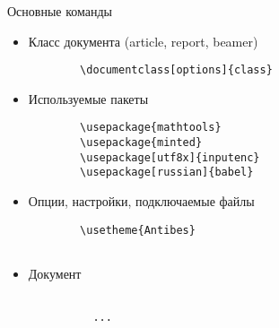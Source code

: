 \begin{frame}[fragile]{Основные команды}
  \begin{itemize}
    \item Класс документа (article, report, beamer)
      \begin{verbatim}
        \documentclass[options]{class}
      \end{verbatim}
    \pause  
    \item Используемые пакеты 
      \begin{verbatim}
        \usepackage{mathtools}
        \usepackage{minted}
        \usepackage[utf8x]{inputenc}
        \usepackage[russian]{babel}
      \end{verbatim}
    \pause  
    \item Опции, настройки, подключаемые файлы
      \begin{verbatim}
        \usetheme{Antibes}
        
      \end{verbatim}
    \pause  
    \item Документ
      \begin{verbatim}
        
          ...
        
      \end{verbatim}
  \end{itemize}
\end{frame}